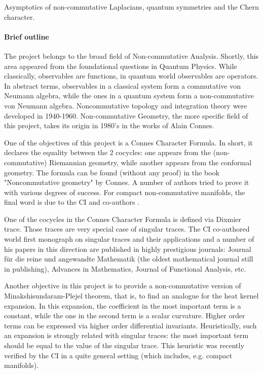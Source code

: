 \documentclass[12pt]{article}
\newcommand{\archeading}[1]{\vspace{.3cm} \noindent{\bfseries #1} \vspace{.1cm}   }
\begin{document}
\parindent=20pt
\pagestyle{empty}
\newpage

\archeading{Project Title} Asymptotics of non-commutative Laplacians, quantum symmetries and the Chern character.

\bigskip\archeading{Project quality and innovation}


\paragraph*{Brief outline} 

The project belongs to the broad field of Non-commutative Analysis. Shortly, this area appeared from the foundational questions in Quantum Physics. While classically, observables are functions, in quantum world observables are operators. In abstract terms, observables in a classical system form a commutative von Neumann algebra, while the ones in a quantum system form a non-commutative von Neumann algebra. Noncommutative topology and integration theory were developed in 1940-1960. Non-commutative Geometry, the more specific field of this project, takes its origin in 1980's in the works of Alain Connes.

One of the objectives of this project is a Connes Character Formula. In short, it declares the equality between the 2 cocycles: one appears from the (non-commutative) Riemannian geometry, while another appears from the conformal geometry. The formula can be found (without any proof) in the book "Noncommutative geometry" by Connes. A number of authors tried to prove it with various degrees of success. For compact non-commutative manifolds, the final word is due to the CI and co-authors \cite{CRSZ}.

One of the cocycles in the Connes Character Formula is defined via Dixmier trace. Those traces are very special case of singular traces. The CI co-authored world first monograph on singular traces and their applications and a number of his papers in this direction are published in highly prestigious journals: Journal f\"ur die reine und angewandte Mathematik (the oldest mathematical journal still in publishing), Advances in Mathematics, Journal of Functional Analysis, etc.

Another objective in this project is to provide a non-commutative version of Minakshisundaram-Plejel theorem, that is, to find an analogue for the heat kernel expansion. In this expansion, the coefficient in the most important term is a constant, while the one in the second term is a scalar curvature. Higher order terms can be expressed via higher order differential invariants. Heuristically, such an expansion is strongly related with singular traces: the most important term should be equal to the value of the singular trace. This heuristic was recently verified by the CI in a quite general setting (which includes, e.g. compact manifolds).
\end{document}
